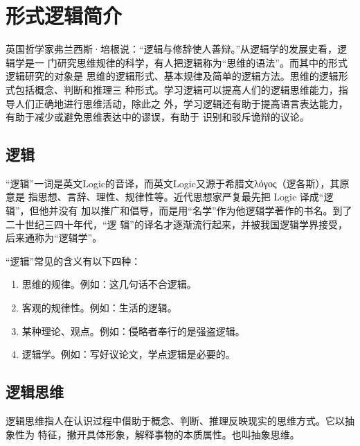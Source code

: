 \documentclass[final,oneside]{ctexbook}
\begin{document}
\section{形式逻辑简介}

英国哲学家弗兰西斯·培根说：“逻辑与修辞使人善辩。”从逻辑学的发展史看，逻辑学是一
门研究思维规律的科学，有人把逻辑称为“思维的语法”。而其中的形式逻辑研究的对象是
思维的逻辑形式、基本规律及简单的逻辑方法。思维的逻辑形式包括概念、判断和推理三
种形式。学习逻辑可以提高人们的逻辑思维能力，指导人们正确地进行思维活动，除此之
外，学习逻辑还有助于提高语言表达能力，有助于减少或避免思维表达中的谬误，有助于
识别和驳斥诡辩的议论。

\subsection{逻辑}


“逻辑”一词是英文Logic的音译，而英文Logic又源于希腊文λ\'ογος（逻各斯），其原意是
指思想、言辞、理性、规律性等。近代思想家严复最先把 Logic 译成“逻辑”，但他并没有
加以推广和倡导，而是用“名学”作为他逻辑学著作的书名。到了二十世纪三四十年代，“逻
辑”的译名才逐渐流行起来，并被我国逻辑学界接受，后来通称为“逻辑学”。

“逻辑”常见的含义有以下四种：

\begin{enumerate}
  \item 思维的规律。例如：这几句话不合逻辑。

  \item 客观的规律性。例如：生活的逻辑。

  \item 某种理论、观点。例如：侵略者奉行的是强盗逻辑。

  \item 逻辑学。例如：写好议论文，学点逻辑是必要的。
\end{enumerate}

\subsection{逻辑思维}

逻辑思维指人在认识过程中借助于概念、判断、推理反映现实的思维方式。它以抽象性为
特征，撇开具体形象，解释事物的本质属性。也叫抽象思维。
\end{document}
